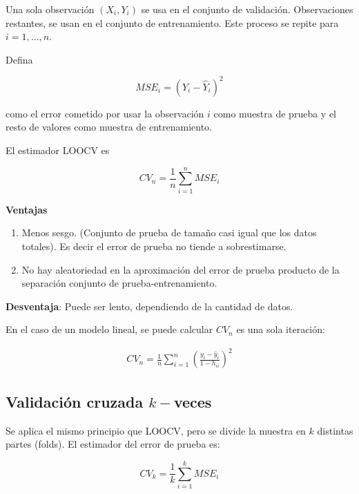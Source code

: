 \documentclass[
  12pt,
]{book}
\providecommand{\tightlist}{%
  \setlength{\itemsep}{0pt}\setlength{\parskip}{0pt}}
\theoremstyle{definition}
\theoremstyle{definition}
\theoremstyle{definition}
\theoremstyle{definition}
\theoremstyle{remark}
\begin{document}
Una sola observación \(\left( X_{i}, Y_{i} \right)\) se usa en el conjunto de validación. Observaciones restantes, se usan en el conjunto de entrenamiento. Este proceso se repite para \(i=1,\ldots,n\).

Defina

\begin{equation*}
MSE_{i} =(Y_{i}-\hat{Y}_{i})^{2}
\end{equation*}

como el error cometido por usar la observación \(i\) como muestra de prueba y el resto de valores como muestra de entrenamiento.

El estimador LOOCV es

\begin{equation*}
CV_{n} = \frac{1}{n} \sum_{i=1}^{n} MSE_{i}
\end{equation*}

\textbf{Ventajas}

\begin{enumerate}
\def\labelenumi{\arabic{enumi}.}
\tightlist
\item
  Menos sesgo. (Conjunto de prueba de tamaño casi igual que los datos totales). Es decir el error de prueba no tiende a sobrestimarse.
\item
  No hay aleatoriedad en la aproximación del error de prueba producto de la separación conjunto de prueba-entrenamiento.
\end{enumerate}

\textbf{Desventaja}: Puede ser lento, dependiendo de la cantidad de datos.

En el caso de un modelo lineal, se puede calcular \(CV_n\) es una sola iteración:

\begin{align*}
CV_n=\frac 1 n \sum_{i=1}^n\left(\frac{y_i-\hat y_i}{1-h_{ii}}\right)^2
\end{align*}

\hypertarget{validaciuxf3n-cruzada-k-veces}{%
\subsection{\texorpdfstring{Validación cruzada \(k-\)veces}{Validación cruzada k-veces}}\label{validaciuxf3n-cruzada-k-veces}}

Se aplica el mismo principio que LOOCV, pero se divide la muestra en \(k\) distintas partes (folds). El estimador del error de prueba es:

\begin{equation*}
CV_{k} = \frac{1}{k} \sum_{i=1}^{k} MSE_{i}
\end{equation*}
\end{document}
